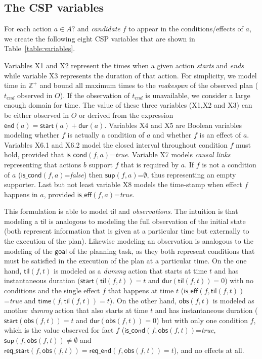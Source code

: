 \documentclass{ecai}
\newcommand{\dur}{\mathsf{dur}}    %
\newcommand{\iscond}{\mathsf{is\_cond}}    %
\newcommand{\iseff}{\mathsf{is\_eff}}    %
\newcommand{\obs}{\mathsf{obs}}    %
\newcommand{\start}{\mathsf{start}}%
\newcommand{\en}{\mathsf{end}}     %
\newcommand{\til}{\mathsf{til}}    %
\newcommand{\supp}{\mathsf{sup}}   %
\newcommand{\tim}{\mathsf{time}}   %
\newcommand{\reqs}{\mathsf{req\_{start}}} %
\newcommand{\reqe}{\mathsf{req\_{end}}}   %
\newcommand{\goal}{\mathsf{goal}}  %
\begin{document}
\subsection{The CSP variables}
For each action $a\in A?$ and {\em candidate} $f$ to appear in the conditions/effects of $a$, we create the following eight CSP variables that are shown in Table~\ref{table:variables}. 

Variables X1 and X2 represent the times when a given action {\em starts} and {\em ends} while variable X3 represents the duration of that action. For simplicity, we model time in $\mathbb{Z}^+$ and bound all maximum times to the {\em makespan} of the observed plan ($t_{end}$ observed in $O$). If the observation of $t_{end}$ is unavailable, we consider a large enough domain for time. The value of these three variables (X1,X2 and X3) can be either observed in $O$ or derived from the expression $\en(a)=\start(a)+\dur(a)$. Variables X4 and X5 are Boolean variables modeling whether $f$ is actually a condition of $a$ and whether $f$ is an effect of $a$. Variables X6.1 and X6.2 model the closed interval throughout condition $f$ must hold, provided that $\iscond(f,a)$=\textit{true}. Variable X7 models {\em causal links} representing that actions $b$ support $f$ that is required by $a$. If $f$ is not a condition of $a$ ($\iscond(f,a)$=\textit{false}) then $\supp(f,a)$=$\emptyset$, thus representing an empty supporter. Last but not least variable X8 models the time-stamp when effect $f$ happens in $a$, provided $\iseff(f,a)$=\textit{true}.

This formulation is able to model $\til$ and {\em observations}. The intuition is that modeling a $\til$ is analogous to modeling the full observation of the initial state (both represent information that is given at a particular time but externally to the execution of the plan). Likewise modeling an observation is analogous to the modeling of the $\goal$ of the planning task, as they both represent conditions that must be satisfied in the execution of the plan at a particular time. On the one hand, $\til(f,t)$ is modeled as a {\em dummy} action that starts at time $t$ and has instantaneous duration ($\start(\til(f,t))=t$ and $\dur(\til(f,t))=0$) with no conditions and the single effect $f$ that happens at time $t$ ($\iseff(f,\til(f,t))$=\textit{true} and $\tim(f,\til(f,t))=t$). On the other hand, $\obs(f,t)$ is modeled as another {\em dummy} action that also starts at time $t$ and has instantaneous duration ($\start(\obs(f,t))=t$ and $\dur(\obs(f,t))=0$) but with only one condition $f$, which is the value observed for fact $f$ ($\iscond(f,\obs(f,t))$=\textit{true}, $\supp(f,\obs(f,t))\neq \emptyset$ and $\reqs(f,\obs(f,t))=\reqe(f,\obs(f,t))=t$), and no effects at all. 
\end{document}
